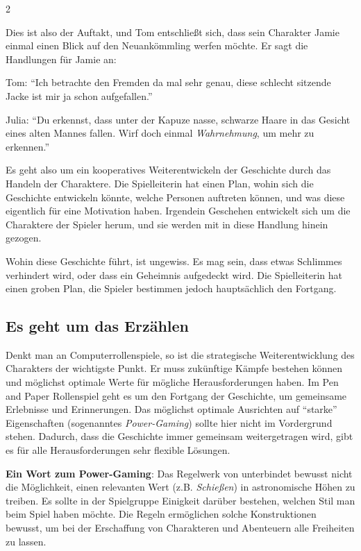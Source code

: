 \begin{multicols}{2}
\begin{pexample}
Dies ist also der Auftakt, und Tom entschließt sich, dass sein Charakter Jamie einmal einen Blick auf den Neuankömmling werfen möchte. Er sagt die Handlungen für Jamie an:

Tom: ``Ich betrachte den Fremden da mal sehr genau, diese schlecht sitzende Jacke ist mir ja schon aufgefallen.''

Julia: ``Du erkennst, dass unter der Kapuze nasse, schwarze Haare in das Gesicht eines alten Mannes fallen. Wirf doch einmal \textit{Wahrnehmung}, um mehr zu erkennen.''
\end{pexample}

Es geht also um ein kooperatives Weiterentwickeln der Geschichte durch das Handeln der Charaktere. Die Spielleiterin hat einen Plan, wohin sich die Geschichte entwickeln könnte, welche Personen auftreten können, und was diese eigentlich für eine Motivation haben. Irgendein Geschehen entwickelt sich um die Charaktere der Spieler herum, und sie werden mit in diese Handlung hinein gezogen.

Wohin diese Geschichte führt, ist ungewiss. Es mag sein, dass etwas Schlimmes verhindert wird, oder dass ein Geheimnis aufgedeckt wird. Die Spielleiterin hat einen groben Plan, die Spieler bestimmen jedoch hauptsächlich den Fortgang.

\subsection{Es geht um das Erzählen}

Denkt man an Computerrollenspiele, so ist die strategische Weiterentwicklung des Charakters der wichtigste Punkt. Er muss zukünftige Kämpfe bestehen können und möglichst optimale Werte für mögliche Herausforderungen haben. Im Pen and Paper Rollenspiel geht es um den Fortgang der Geschichte, um gemeinsame Erlebnisse und Erinnerungen. Das möglichst optimale Ausrichten auf ``starke'' Eigenschaften (sogenanntes \textit{Power-Gaming}) sollte hier nicht im Vordergrund stehen. Dadurch, dass die Geschichte immer gemeinsam weitergetragen wird, gibt es für alle Herausforderungen sehr flexible Lösungen.

\textbf{Ein Wort zum Power-Gaming}: Das Regelwerk von  unterbindet bewusst nicht die Möglichkeit, einen relevanten Wert (z.B. \textit{Schießen}) in astronomische Höhen zu treiben. Es sollte in der Spielgruppe Einigkeit darüber bestehen, welchen Stil man beim Spiel haben möchte. Die Regeln ermöglichen solche Konstruktionen bewusst, um bei der Erschaffung von Charakteren und Abenteuern alle Freiheiten zu lassen.


\end{multicols}
